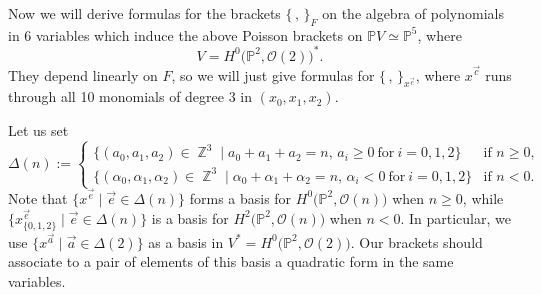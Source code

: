 \documentclass[pdftex]{sigma}
\numberwithin{equation}{section}
\DeclareMathOperator\Z{\mathbb Z}
\renewcommand{\P}{{\mathbb P}}
\newcommand{\OO}{{\mathcal O}}
\begin{document}
Now we will derive formulas for the brackets $\{\,,\,\}_F$ on the algebra of polynomials in $6$ variables which induce the above Poisson brackets on $\P V\simeq \P^5$,
where
\[
V=H^0\big(\P^2,\OO(2)\big)^*.
\]
They depend linearly on $F$, so we will just give formulas for $\{\,,\,\}_{x^{\vec{c}}}$, where $x^{\vec{c}}$ runs through all 10 monomials of degree $3$ in $(x_0,x_1,x_2)$.

Let us set
\[\Delta(n):=\begin{cases}
	\big\{(a_0,a_1,a_2)\in\Z^3\mid a_0+a_1+a_2=n,\, a_i\geq 0 \ \text{for} \ i=0,1,2\big\}& \text{if }n\geq 0,\\
	\big\{(\alpha_0,\alpha_1,\alpha_2)\in \Z^3\mid \alpha_0+\alpha_1+\alpha_2=n,\, \alpha_i<0 \ \text{for}  \ i=0,1,2\big\} & \text{if }n<0.
\end{cases}\]
Note that $\{x^{\vec{e}}\mid \vec{e}\in \Delta(n)\}$ forms a basis for $H^0\big(\P^2,\OO(n)\big)$ when $n\geq 0$, while
$\big\{x^{\vec{e}}_{\{0,1,2\}}\mid \vec{e}\in \Delta(n)\big\}$ is a basis for $H^2\big(\P^2,\OO(n)\big)$ when $n<0$.
In particular, we use $\big\{x^{\vec{a}} \mid \vec{a}\in\Delta(2)\big\}$ as a basis in $V^*=H^0\big(\P^2,\OO(2)\big)$. Our brackets should associate to a pair of elements of this basis a quadratic form
in the same variables.
\end{document}
